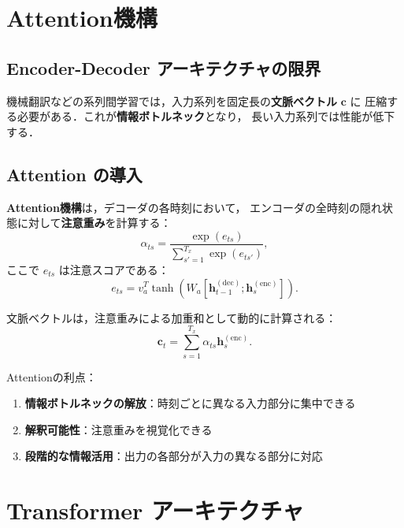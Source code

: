 \section{Attention機構}
\label{sec:attention}

\subsection{Encoder-Decoder アーキテクチャの限界}

機械翻訳などの系列間学習では，入力系列を固定長の\textbf{文脈ベクトル} $\boldsymbol{c}$ に
圧縮する必要がある．これが\textbf{情報ボトルネック}となり，
長い入力系列では性能が低下する．

\subsection{Attention の導入}

\textbf{Attention機構}\cite{Bahdanau2015}は，デコーダの各時刻において，
エンコーダの全時刻の隠れ状態に対して\textbf{注意重み}を計算する：
\begin{equation}
  \alpha_{ts} = \frac{\exp(e_{ts})}{\sum_{s'=1}^{T_x} \exp(e_{ts'})},
  \label{eq:attention-weight}
\end{equation}
ここで $e_{ts}$ は注意スコアである：
\begin{equation}
  e_{ts} = v_a^T \tanh(W_a [\boldsymbol{h}_{t-1}^{(\mathrm{dec})}; \boldsymbol{h}_s^{(\mathrm{enc})}]).
\end{equation}

文脈ベクトルは，注意重みによる加重和として動的に計算される：
\begin{equation}
  \boldsymbol{c}_t = \sum_{s=1}^{T_x} \alpha_{ts} \boldsymbol{h}_s^{(\mathrm{enc})}.
\end{equation}

Attentionの利点：
\begin{enumerate}
  \item \textbf{情報ボトルネックの解放}：時刻ごとに異なる入力部分に集中できる
  \item \textbf{解釈可能性}：注意重みを視覚化できる
  \item \textbf{段階的な情報活用}：出力の各部分が入力の異なる部分に対応
\end{enumerate}

\section{Transformer アーキテクチャ}
\label{sec:transformer}

